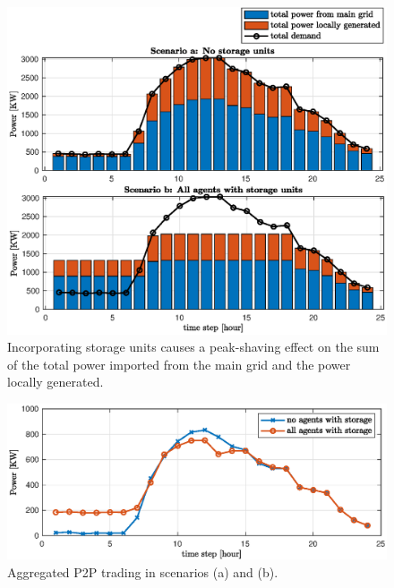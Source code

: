 \documentclass{IEEEtran}  %
\newcommand{\0}{\mathbf{0}}
\newcommand{\1}{\mathbf{1}}
\newcommand{\note}[1]{\textcolor{blue}{\texttt{#1}}}
\begin{document}
%
%

\begin{figure}[t]
	\centering\marginnote{\note{R3-6}} 
	\includegraphics[width=1\linewidth]{figures/simB_0402_pt1_v3}
	\caption{	Incorporating storage units causes a peak-shaving effect on the sum of the total power imported from the main grid and the power locally generated.}
	\label{fig:sim_B1}
\end{figure}
\begin{figure}[t]
	\centering 
	\includegraphics[width=1\linewidth]{figures/simB_0402_pt2_v4}
	\caption{Aggregated P2P trading in scenarios (a) and (b).
	}
	\label{fig:sim_B2}
\end{figure}  
\end{document}
